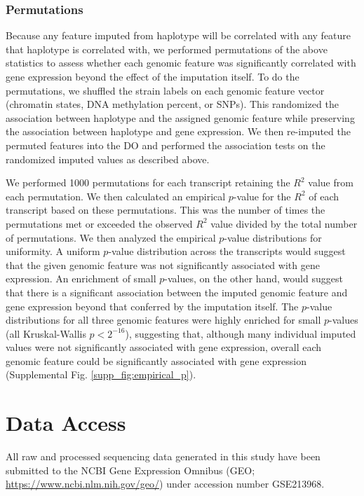 \documentclass[
  11pt,
]{article}
\begin{document}
\hypertarget{permutations}{%
\subsubsection{Permutations}\label{permutations}}

Because any feature imputed from haplotype will be correlated with any
feature that haplotype is correlated with, we performed permutations of
the above statistics to assess whether each genomic feature was
significantly correlated with gene expression beyond the effect of the
imputation itself. To do the permutations, we shuffled the strain labels
on each genomic feature vector (chromatin states, DNA methylation
percent, or SNPs). This randomized the association between haplotype and
the assigned genomic feature while preserving the association between
haplotype and gene expression. We then re-imputed the permuted features
into the DO and performed the association tests on the randomized
imputed values as described above.

We performed 1000 permutations for each transcript retaining the \(R^2\)
value from each permutation. We then calculated an empirical \(p\)-value
for the \(R^2\) of each transcript based on these permutations. This was
the number of times the permutations met or exceeded the observed
\(R^2\) value divided by the total number of permutations. We then
analyzed the empirical \(p\)-value distributions for uniformity. A
uniform \(p\)-value distribution across the transcripts would suggest
that the given genomic feature was not significantly associated with
gene expression. An enrichment of small \(p\)-values, on the other hand,
would suggest that there is a significant association between the
imputed genomic feature and gene expression beyond that conferred by the
imputation itself. The \(p\)-value distributions for all three genomic
features were highly enriched for small \(p\)-values (all Kruskal-Wallis
\(p < 2^{-16}\)), suggesting that, although many individual imputed
values were not significantly associated with gene expression, overall
each genomic feature could be significantly associated with gene
expression (Supplemental Fig. \ref{supp_fig:empirical_p}).

\hypertarget{data-access}{%
\section{Data Access}\label{data-access}}

All raw and processed sequencing data generated in this study have been
submitted to the NCBI Gene Expression Omnibus (GEO;
\url{https://www.ncbi.nlm.nih.gov/geo/}) under accession number
GSE213968.
\end{document}
